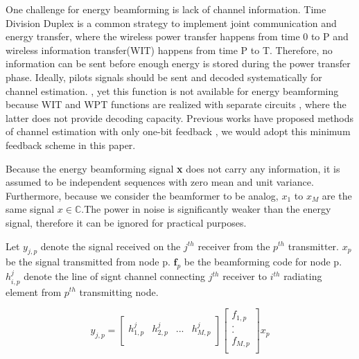 \documentclass[journal]{IEEEtran}
\begin{document}
One challenge for energy beamforming is lack of channel information. Time Division Duplex is a common strategy to implement joint communication and energy transfer, where the wireless power transfer happens from time 0 to P and wireless information transfer(WIT) happens from time P to T. Therefore, no information can be sent before enough energy is stored during the power transfer phase. Ideally, pilots signals should be sent and decoded systematically for channel estimation. \cite{1597555}, yet this function is not available for energy beamforming because WIT and WPT functions are realized with separate circuits \cite{7462480}, where the latter does not provide decoding capacity. Previous works have proposed methods of channel estimation with only one-bit feedback \cite{6884811}, we would adopt this minimum feedback scheme in this paper.

Because the energy beamforming signal \textbf{x} does not carry any information, it is assumed to be independent sequences with zero mean and unit variance. \cite{6884811} Furthermore, because we consider the beamformer to be analog, $x_1$ to $x_M$ are the same signal $x \in \mathbb{C}$.The power in noise is significantly weaker than the energy signal, therefore it can be ignored for practical purposes.

Let $y_{j,p}$ denote the signal received on the $j^{th}$ receiver from the $p^{th}$ transmitter. $x_p$ be the signal transmitted from node p. $\textbf{f}_p$ be the beamforming code for node p.  $h_{i,p}^j$ denote the line of signt channel connecting $j^{th}$ receiver to $i^{th}$ radiating element from $p^{th}$ transmitting node.

\[
y_{j,p}=
\begin{bmatrix}
h_{1,p}^j & h_{2,p}^j & ... & h_{M,p}^j\\
\end{bmatrix}
\begin{bmatrix}
f_{1,p}\\
.\\
.\\
f_{M,p}\\
\end{bmatrix}
x_p
\]
\end{document}
